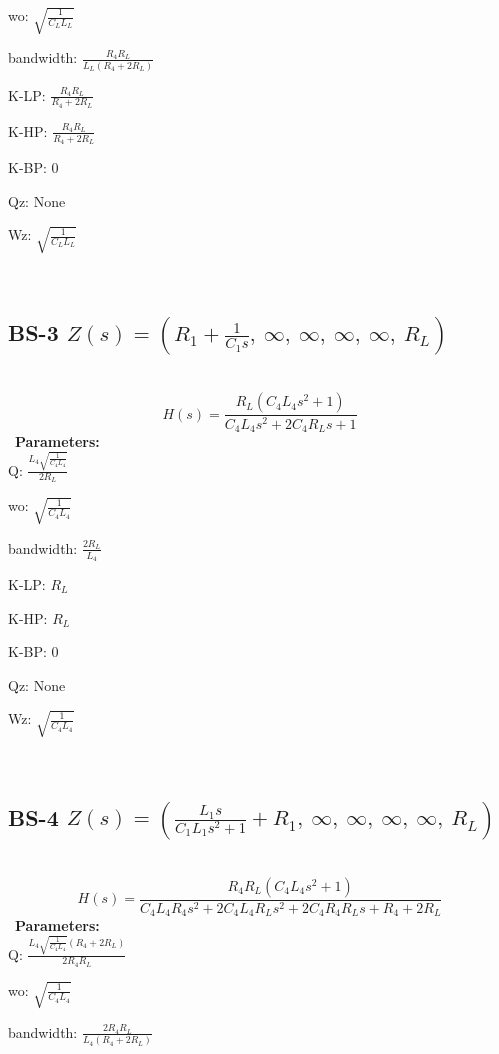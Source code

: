 \documentclass{article}
\begin{document}
wo: $\sqrt{\frac{1}{C_{L} L_{L}}}$\ 

bandwidth: $\frac{R_{4} R_{L}}{L_{L} \left(R_{4} + 2 R_{L}\right)}$\ 

K-LP: $\frac{R_{4} R_{L}}{R_{4} + 2 R_{L}}$\ 

K-HP: $\frac{R_{4} R_{L}}{R_{4} + 2 R_{L}}$\ 

K-BP: $0$\ 

Qz: $\text{None}$\ 

Wz: $\sqrt{\frac{1}{C_{L} L_{L}}}$\ 

\ 

\subsection{BS-3 $Z(s) = \left( R_{1} + \frac{1}{C_{1} s}, \  \infty, \  \infty, \  \infty, \  \infty, \  R_{L}\right)$ } \ 
\textbf{\[H(s) = \frac{R_{L} \left(C_{4} L_{4} s^{2} + 1\right)}{C_{4} L_{4} s^{2} + 2 C_{4} R_{L} s + 1}\] } \ 
\textbf{Parameters:}\\ 

Q: $\frac{L_{4} \sqrt{\frac{1}{C_{4} L_{4}}}}{2 R_{L}}$\ 

wo: $\sqrt{\frac{1}{C_{4} L_{4}}}$\ 

bandwidth: $\frac{2 R_{L}}{L_{4}}$\ 

K-LP: $R_{L}$\ 

K-HP: $R_{L}$\ 

K-BP: $0$\ 

Qz: $\text{None}$\ 

Wz: $\sqrt{\frac{1}{C_{4} L_{4}}}$\ 

\ 

\subsection{BS-4 $Z(s) = \left( \frac{L_{1} s}{C_{1} L_{1} s^{2} + 1} + R_{1}, \  \infty, \  \infty, \  \infty, \  \infty, \  R_{L}\right)$ } \ 
\textbf{\[H(s) = \frac{R_{4} R_{L} \left(C_{4} L_{4} s^{2} + 1\right)}{C_{4} L_{4} R_{4} s^{2} + 2 C_{4} L_{4} R_{L} s^{2} + 2 C_{4} R_{4} R_{L} s + R_{4} + 2 R_{L}}\] } \ 
\textbf{Parameters:}\\ 

Q: $\frac{L_{4} \sqrt{\frac{1}{C_{4} L_{4}}} \left(R_{4} + 2 R_{L}\right)}{2 R_{4} R_{L}}$\ 

wo: $\sqrt{\frac{1}{C_{4} L_{4}}}$\ 

bandwidth: $\frac{2 R_{4} R_{L}}{L_{4} \left(R_{4} + 2 R_{L}\right)}$\ 
\end{document}
